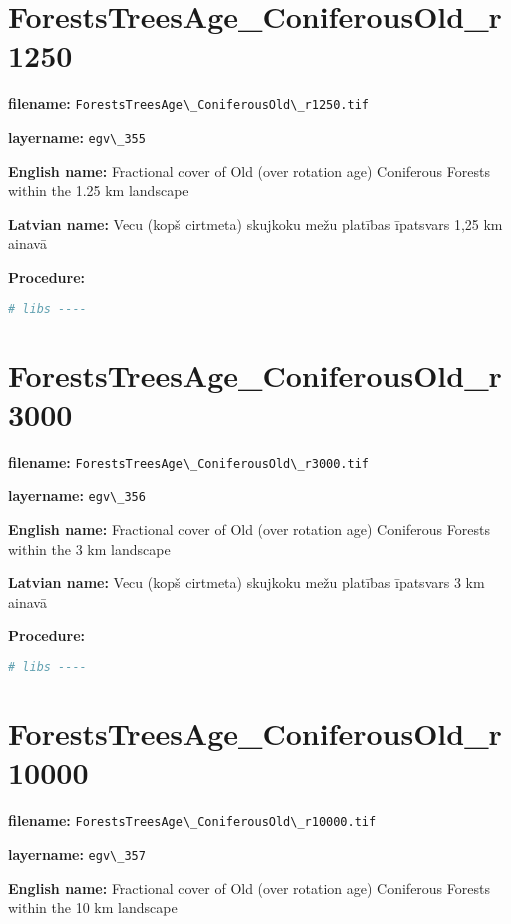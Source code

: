 \documentclass[
]{book}
\newcommand{\passthrough}[1]{#1}
\begin{document}
\section{ForestsTreesAge\_ConiferousOld\_r1250}\label{ch06.355}

\textbf{filename:} \passthrough{\lstinline!ForestsTreesAge\_ConiferousOld\_r1250.tif!}

\textbf{layername:} \passthrough{\lstinline!egv\_355!}

\textbf{English name:} Fractional cover of Old (over rotation age) Coniferous Forests within the 1.25 km landscape

\textbf{Latvian name:} Vecu (kopš cirtmeta) skujkoku mežu platības īpatsvars 1,25 km ainavā

\textbf{Procedure:}

\begin{lstlisting}[language=R]
# libs ----
\end{lstlisting}

\section{ForestsTreesAge\_ConiferousOld\_r3000}\label{ch06.356}

\textbf{filename:} \passthrough{\lstinline!ForestsTreesAge\_ConiferousOld\_r3000.tif!}

\textbf{layername:} \passthrough{\lstinline!egv\_356!}

\textbf{English name:} Fractional cover of Old (over rotation age) Coniferous Forests within the 3 km landscape

\textbf{Latvian name:} Vecu (kopš cirtmeta) skujkoku mežu platības īpatsvars 3 km ainavā

\textbf{Procedure:}

\begin{lstlisting}[language=R]
# libs ----
\end{lstlisting}

\section{ForestsTreesAge\_ConiferousOld\_r10000}\label{ch06.357}

\textbf{filename:} \passthrough{\lstinline!ForestsTreesAge\_ConiferousOld\_r10000.tif!}

\textbf{layername:} \passthrough{\lstinline!egv\_357!}

\textbf{English name:} Fractional cover of Old (over rotation age) Coniferous Forests within the 10 km landscape
\end{document}
